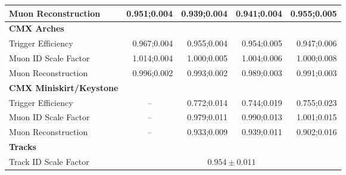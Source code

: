\begin{table}[h]
\begin{center}
\begin{tabular}{l D{;}{\pm}{-1}D{;}{\pm}{-1}D{;}{\pm}{-1}D{;}{\pm}{-1}}
Muon Reconstruction      & 0.951;0.004 & 0.939;0.004 & 0.941;0.004 & 0.955;0.005 \\
\midrule
{\bf CMX Arches} & & & & \\
Trigger Efficiency       & 0.967;0.004 & 0.955;0.004 & 0.954;0.005 & 0.947;0.006 \\
Muon ID Scale Factor     & 1.014;0.004 & 1.000;0.005 & 1.004;0.006 & 1.000;0.008 \\
Muon Reconstruction       & 0.996;0.002 & 0.993;0.002 & 0.989;0.003 & 0.991;0.003 \\
\midrule
{\bf CMX Miniskirt/Keystone} & & & & \\
Trigger Efficiency       &  & 0.772;0.014 & 0.744;0.019 & 0.755;0.023 \\
Muon ID Scale Factor     &  & 0.979;0.011 & 0.990;0.013 & 1.001;0.015 \\
Muon Reconstruction      &  & 0.933;0.009 & 0.939;0.011 & 0.902;0.016 \\
\midrule
{\bf Tracks} & & & & \\
Track ID Scale Factor    &  \\
\bottomrule
\end{tabular}
\end{center}
\end{table}


